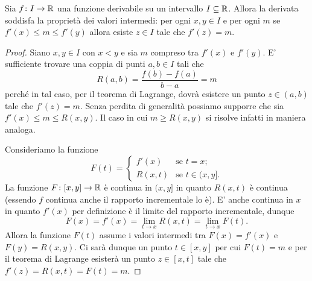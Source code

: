 \begin{theorem}
Sia $f\colon I \to \mathbb R$ una funzione derivabile su un intervallo $I\subseteq \mathbb R$.
Allora la derivata soddisfa la proprietà dei valori intermedi: per ogni $x,y\in I$ e per ogni $m$
se $f'(x) \le m \le f'(y)$ allora esiste
$z\in I$ tale che $f'(z)=m$.
\end{theorem}
%
\begin{proof}
Siano $x,y \in I$ con $x<y$ e sia $m$ compreso tra $f'(x)$ e $f'(y)$.
E' sufficiente trovare una coppia di punti $a,b\in I$ tali che
\[
  R(a,b) = \frac{f(b)-f(a)}{b-a} = m
\]
perché in tal caso, per il teorema di Lagrange, dovrà esistere un punto $z\in (a,b)$ tale che $f'(z)=m$.
Senza perdita di generalità possiamo supporre che sia $f'(x) \le m \le R(x,y)$.
Il caso in cui $m\ge R(x,y)$ si risolve infatti in maniera analoga.

Consideriamo la funzione
\[
F(t)
= \begin{cases}
  f'(x) & \text{se $t=x$};\\
  R(x,t) & \text{se $t\in(x,y]$}.
\end{cases}
\]
La funzione $F\colon [x,y]\to \mathbb R$ è continua in $(x,y]$ in quanto $R(x,t)$ è continua (essendo $f$ continua
anche il rapporto incrementale lo è). E' anche continua in $x$ in quanto $f'(x)$
per definizione è il limite del rapporto incrementale, dunque
\[
  F(x) = f'(x) = \lim_{t\to x} R(x,t) = \lim_{t\to x} F(t).
\]
Allora la funzione $F(t)$ assume i valori intermedi tra $F(x)=f'(x)$ e $F(y)=R(x,y)$.
Ci sarà dunque un punto $t\in [x,y]$ per cui $F(t) = m$ e per il teorema di Lagrange
esisterà un punto $z\in[x,t]$ tale che $f'(z) = R(x,t) = F(t) = m$.
\end{proof}

